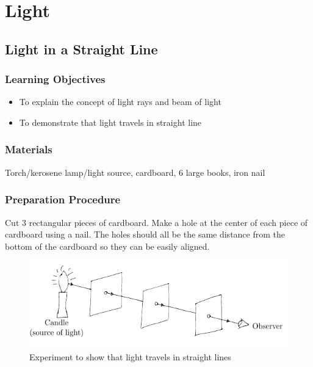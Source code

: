 \section{Light}


	
	
	\subsection{Light in a Straight Line}

\subsubsection*{Learning Objectives}
\begin{itemize}
\item{To explain the concept of light rays and beam of light} 
\item{To demonstrate that light travels in straight line} 
\end{itemize}

\subsubsection*{Materials}
Torch/kerosene lamp/light source, cardboard, 6 large books, iron nail

\subsubsection*{Preparation Procedure}
Cut 3 rectangular pieces of cardboard. Make a hole at the center of each piece of cardboard using a nail. The holes should all be the same distance from the bottom of the cardboard so they can be easily aligned.

\begin{figure}[h!]
\begin{center}
\includegraphics{./img/prop-of-light.png}
\caption{Experiment to show that light travels in straight lines}
\label{fig:prop-of-light}
\end{center}
\end{figure}

